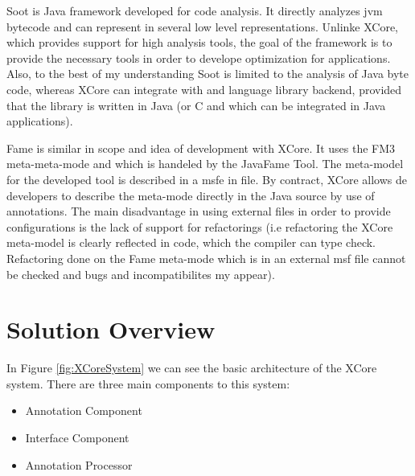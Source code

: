         Soot is Java framework developed for code analysis. It directly analyzes jvm bytecode and can represent in several low level representations. Unlinke XCore, which provides support for 
high analysis tools, the goal of the framework is to provide the necessary tools in order to develope optimization for applications. Also, to the best of my understanding Soot is limited to the
analysis of Java byte code, whereas XCore can integrate with and language library backend, provided that the library is written in Java (or C and which can be integrated in Java applications).

        Fame is similar in scope and idea of development with XCore. It uses the FM3 meta-meta-mode \cite{tools:fame} and which is handeled by the JavaFame Tool. The meta-model for the developed
tool is described in a msfe in file. By contract, XCore allows de developers to describe the meta-mode directly in the Java source by use of annotations. The main disadvantage in using external
files in order to provide configurations is the lack of support for refactorings (i.e refactoring the XCore meta-model is clearly reflected in code, which the compiler can type check. Refactoring
done on the Fame meta-mode which is in an external msf file cannot be checked and bugs and incompatibilites my appear). 



\section {Solution Overview}\label{ch:2.1}

        In Figure \ref{fig:XCoreSystem} we can see the basic architecture of the XCore system. There are three main components to this
system:
        \begin{itemize}
                \item Annotation Component
                \item Interface Component
                \item Annotation Processor
        \end{itemize}
        
